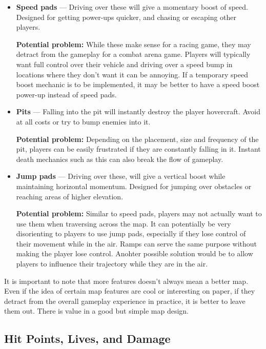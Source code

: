 \documentclass{article}
\theoremstyle{definition}
\begin{document}
\begin{itemize}
  \item \textbf{Speed pads} --- Driving over these will give a momentary boost of
    speed. Designed for getting power-ups quicker, and chasing or escaping
    other players.

    \textbf{Potential problem:} While these make sense for a racing game, they
    may detract from the gameplay for a combat arena game. Players will
    typically want full control over their vehicle and driving over a speed
    bump in locations where they don't want it can be annoying. If a temporary
    speed boost mechanic is to be implemented, it may be better to have a speed
    boost power-up instead of speed pads.
  \item \textbf{Pits} --- Falling into the pit will instantly destroy the player
    hovercraft. Avoid at all costs or try to bump enemies into it.

    \textbf{Potential problem:} Depending on the placement, size and frequency
    of the pit, players can be easily frustrated if they are constantly
    falling in it. Instant death mechanics such as this can also break the flow
    of gameplay.
  \item \textbf{Jump pads} --- Driving over these, will give a vertical boost
    while maintaining horizontal momentum. Designed for jumping over obstacles
    or reaching areas of higher elevation.

    \textbf{Potential problem:} Similar to speed pads, players may not
    actually want to use them when traversing across the map. It can
    potentially be very disorienting to players to use jump pads, especially if
    they lose control of their movement while in the air. Ramps can serve the
    same purpose without making the player lose control. Anohter possible
    solution would be to allow players to influence their trajectory while they
    are in the air.
\end{itemize}

It is important to note that more features doesn't always mean a better map.
Even if the idea of certain map features are cool or interesting on paper, if
they detract from the overall gameplay experience in practice, it is better to
leave them out. There is value in a good but simple map design.

\subsection{Hit Points, Lives, and Damage}
\end{document}
